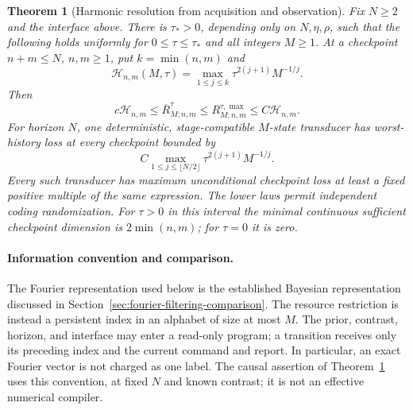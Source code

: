 \documentclass[11pt]{amsart}
\newtheorem{theorem}{Theorem}[section]
\theoremstyle{definition}\newtheorem{definition}[theorem]{Definition}
\theoremstyle{remark}\newtheorem{remark}[theorem]{Remark}
\begin{document}
\begin{theorem}[Harmonic resolution from acquisition and observation]
\label{thm:circle-resolution}
Fix $N\ge2$ and the interface above. There is $\tau_*>0$, depending
only on $N,\eta,\rho$, such that the following holds uniformly for
$0\le\tau\le\tau_*$ and all integers $M\ge1$. At a checkpoint
$n+m\le N$, $n,m\ge1$, put $k=\min(n,m)$ and
\begin{equation}\label{eq:circle-profile}
 \mathcal H_{n,m}(M,\tau)
 =\max_{1\le j\le k}\tau^{2(j+1)}M^{-1/j}.
\end{equation}
Then
\begin{equation}\label{eq:circle-checkpoint-law}
 c\mathcal H_{n,m}\le\overline R^{\tau}_{M;n,m}
 \le R^{\tau,\max}_{M;n,m}\le C\mathcal H_{n,m}.
\end{equation}
For horizon $N$, one deterministic, stage-compatible $M$-state transducer
has worst-history loss at every checkpoint bounded by
\begin{equation}\label{eq:circle-causal-profile}
 C\max_{1\le j\le\lfloor N/2\rfloor}
          \tau^{2(j+1)}M^{-1/j}.
\end{equation}
Every such transducer has maximum unconditional checkpoint loss at least
a fixed positive multiple of the same expression. The lower laws permit
independent coding randomization. For $\tau>0$ in this interval the
minimal continuous sufficient checkpoint dimension is $2\min(n,m)$;
for $\tau=0$ it is zero.
\end{theorem}

\paragraph{Information convention and comparison.}
The Fourier representation used below is the established Bayesian
representation discussed in Section~\ref{sec:fourier-filtering-comparison}.
The resource restriction is instead a persistent index in an alphabet
of size at most $M$. The prior, contrast, horizon, and interface may
enter a read-only program; a transition receives only its preceding
index and the current command and report. In particular, an exact
Fourier vector is not charged as one label. The causal assertion of
Theorem~\ref{thm:circle-resolution} uses this convention, at fixed
$N$ and known contrast; it is not an effective numerical compiler.
\end{document}
